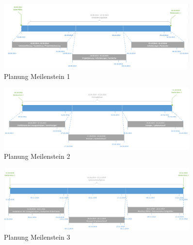 \begin{figure}[h!]
	\centering
	\includegraphics[width=0.9\textwidth]{fig/PlanungBisMS1.png}
	\caption{Planung Meilenstein 1}
	\label{fig:MS1}
\end{figure}
\begin{figure}[h!]
	\centering
	\includegraphics[width=0.9\textwidth]{fig/PlanungBisMS2.png}
	\caption{Planung Meilenstein 2}
	\label{fig:MS2}
\end{figure}
\begin{figure}[h!]
	\centering
	\includegraphics[width=0.9\textwidth]{fig/PlanungBisMS3.png}
	\caption{Planung Meilenstein 3}
	\label{fig:MS3}
\end{figure}